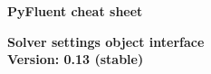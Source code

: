 \documentclass[9pt,landscape]{article}
\begin{document}
\raggedright
\footnotesize

\begin{center}
     \Huge{\textbf{PyFluent cheat sheet}} \\
\end{center}
\begin{center}
     \Large{\textbf{Solver settings object interface}} \\
     \small{\textbf{Version: 0.13 (stable)}} \\
\end{center}

\vspace{-0.15cm}
\noindent\makebox[\linewidth]{\rule{\paperwidth}{2pt}}
\end{document}
